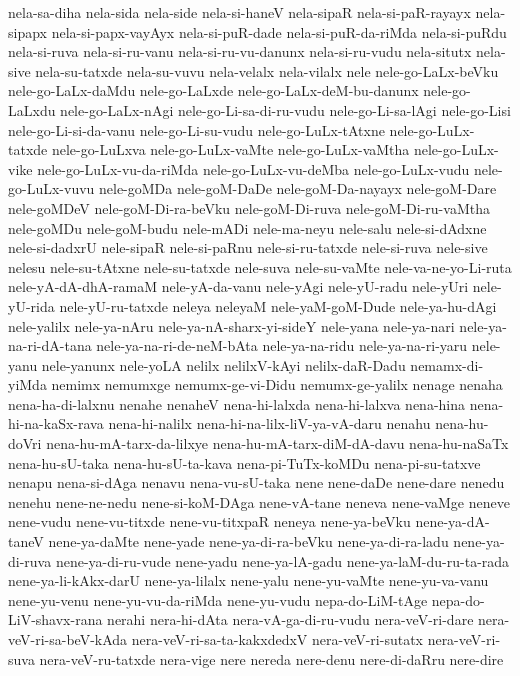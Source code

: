 {nela-sa-diha
nela-sida
nela-side
nela-si-haneV
nela-sipaR
nela-si-paR-rayayx
nela-sipapx
nela-si-papx-vayAyx
nela-si-puR-dade
nela-si-puR-da-riMda
nela-si-puRdu
nela-si-ruva
nela-si-ru-vanu
nela-si-ru-vu-danunx
nela-si-ru-vudu
nela-situtx
nela-sive
nela-su-tatxde
nela-su-vuvu
nela-velalx
nela-vilalx
nele
nele-go-LaLx-beVku
nele-go-LaLx-daMdu
nele-go-LaLxde
nele-go-LaLx-deM-bu-danunx
nele-go-LaLxdu
nele-go-LaLx-nAgi
nele-go-Li-sa-di-ru-vudu
nele-go-Li-sa-lAgi
nele-go-Lisi
nele-go-Li-si-da-vanu
nele-go-Li-su-vudu
nele-go-LuLx-tAtxne
nele-go-LuLx-tatxde
nele-go-LuLxva
nele-go-LuLx-vaMte
nele-go-LuLx-vaMtha
nele-go-LuLx-vike
nele-go-LuLx-vu-da-riMda
nele-go-LuLx-vu-deMba
nele-go-LuLx-vudu
nele-go-LuLx-vuvu
nele-goMDa
nele-goM-DaDe
nele-goM-Da-nayayx
nele-goM-Dare
nele-goMDeV
nele-goM-Di-ra-beVku
nele-goM-Di-ruva
nele-goM-Di-ru-vaMtha
nele-goMDu
nele-goM-budu
nele-mADi
nele-ma-neyu
nele-salu
nele-si-dAdxne
nele-si-dadxrU
nele-sipaR
nele-si-paRnu
nele-si-ru-tatxde
nele-si-ruva
nele-sive
nelesu
nele-su-tAtxne
nele-su-tatxde
nele-suva
nele-su-vaMte
nele-va-ne-yo-Li-ruta
nele-yA-dA-dhA-ramaM
nele-yA-da-vanu
nele-yAgi
nele-yU-radu
nele-yUri
nele-yU-rida
nele-yU-ru-tatxde
neleya
neleyaM
nele-yaM-goM-Dude
nele-ya-hu-dAgi
nele-yalilx
nele-ya-nAru
nele-ya-nA-sharx-yi-sideY
nele-yana
nele-ya-nari
nele-ya-na-ri-dA-tana
nele-ya-na-ri-de-neM-bAta
nele-ya-na-ridu
nele-ya-na-ri-yaru
nele-yanu
nele-yanunx
nele-yoLA
nelilx
nelilxV-kAyi
nelilx-daR-Dadu
nemamx-di-yiMda
nemimx
nemumxge
nemumx-ge-vi-Didu
nemumx-ge-yalilx
nenage
nenaha
nena-ha-di-lalxnu
nenahe
nenaheV
nena-hi-lalxda
nena-hi-lalxva
nena-hina
nena-hi-na-kaSx-rava
nena-hi-nalilx
nena-hi-na-lilx-liV-ya-vA-daru
nenahu
nena-hu-doVri
nena-hu-mA-tarx-da-lilxye
nena-hu-mA-tarx-diM-dA-davu
nena-hu-naSaTx
nena-hu-sU-taka
nena-hu-sU-ta-kava
nena-pi-TuTx-koMDu
nena-pi-su-tatxve
nenapu
nena-si-dAga
nenavu
nena-vu-sU-taka
nene
nene-daDe
nene-dare
nenedu
nenehu
nene-ne-nedu
nene-si-koM-DAga
nene-vA-tane
neneva
nene-vaMge
neneve
nene-vudu
nene-vu-titxde
nene-vu-titxpaR
neneya
nene-ya-beVku
nene-ya-dA-taneV
nene-ya-daMte
nene-yade
nene-ya-di-ra-beVku
nene-ya-di-ra-ladu
nene-ya-di-ruva
nene-ya-di-ru-vude
nene-yadu
nene-ya-lA-gadu
nene-ya-laM-du-ru-ta-rada
nene-ya-li-kAkx-darU
nene-ya-lilalx
nene-yalu
nene-yu-vaMte
nene-yu-va-vanu
nene-yu-venu
nene-yu-vu-da-riMda
nene-yu-vudu
nepa-do-LiM-tAge
nepa-do-LiV-shavx-rana
nerahi
nera-hi-dAta
nera-vA-ga-di-ru-vudu
nera-veV-ri-dare
nera-veV-ri-sa-beV-kAda
nera-veV-ri-sa-ta-kakxdedxV
nera-veV-ri-sutatx
nera-veV-ri-suva
nera-veV-ru-tatxde
nera-vige
nere
nereda
nere-denu
nere-di-daRru
nere-dire
}
